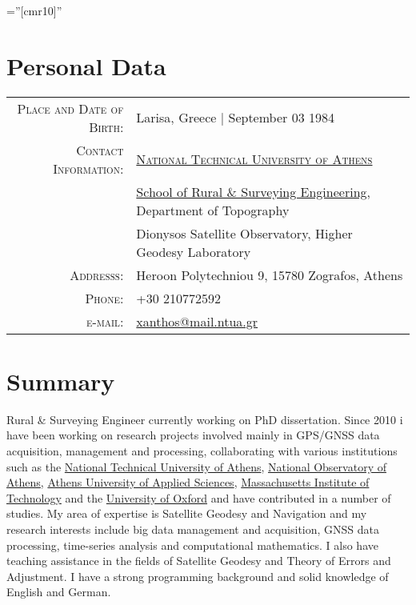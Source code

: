 \documentclass[9pt]{extarticle} %
\begin{document}
\pagestyle{empty} %
\font\fb=''[cmr10]'' %

\par{\bigskip\par} %

\section{Personal Data}

\begin{tabular}{rl}
  \textsc{Place and Date of Birth:} & Larisa, Greece | September 03 1984\\
  \textsc{Contact Information:}
  & \textsc{\href{http://www.ntua.gr/}{National Technical University of Athens}} \\
  & \href{http://www.survey.ntua.gr/}{School of Rural \& Surveying Engineering}, Department of Topography\\
  & Dionysos Satellite Observatory, Higher Geodesy Laboratory \\
  \textsc{Addresss:} & Heroon Polytechniou 9, 15780 Zografos, Athens\\
  \textsc{Phone:} & +30 210772592\\
  \textsc{e-mail:} & \href{mailto:xanthos@mail.ntua.gr}{xanthos@mail.ntua.gr}
\end{tabular}
\medskip

\section{Summary} \par
Rural \& Surveying Engineer currently working on PhD dissertation. Since 2010 i have been working on research 
projects involved mainly in GPS/GNSS data acquisition, management and processing, collaborating with various 
institutions such as the \href{http://www.ntua.gr/}{National Technical University of Athens}, 
\href{http://www.noa.gr/index.php?lang=en}{National Observatory of Athens}, 
\href{http://www.teiath.gr/?lang=en}{Athens University of Applied Sciences}, 
\href{https://web.mit.edu/}{Massachusetts Institute of Technology} and the 
\href{http://www.ox.ac.uk/}{University of Oxford} and have contributed in a number of studies. My area of expertise 
is Satellite Geodesy and Navigation and my research interests include big data management and acquisition, GNSS 
data processing, time-series analysis and computational mathematics. I also have teaching assistance in the 
fields of Satellite Geodesy and Theory of Errors and Adjustment. I have a strong programming background and
solid knowledge of English and German.
\end{document}
